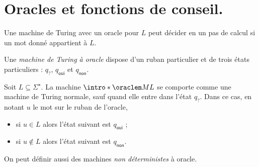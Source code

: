 \documentclass[./main]{subfiles}
\begin{document}
  \chapter{Oracles et fonctions de conseil.}

  Une machine de Turing avec un oracle pour $L$ peut décider en un pas de calcul si un mot donné appartient à $L$.

  \begin{defn}
    Une \textit{machine de Turing à oracle} dispose d'un ruban particulier et de trois états particuliers : $q_\textsf{?}$, $q_\mathsf{oui}$ et $q_\mathsf{non}$.

    Soit $L \subseteq \Sigma^\star$.
    La machine $\intro*\oraclem M L$ se comporte comme  une machine de Turing normale, sauf quand elle entre dans l'état $q_\textsf{?}$.
    Dans ce cas, en notant $u$ le mot sur le ruban de l'oracle,
    \begin{itemize}
      \item si $u \in L$ alors l'état suivant est $q_\mathsf{oui}$ ;
      \item si $u \not\in  L$ alors l'état suivant est $q_\mathsf{non}$.
    \end{itemize}
  \end{defn}

  \begin{rmk}
    On peut définir aussi des machines \textit{non déterministes} à oracle.
  \end{rmk}
\end{document}
